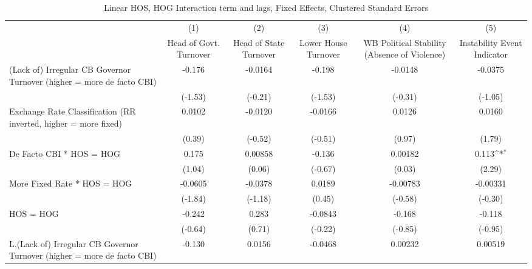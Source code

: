 {
\def\sym#1{\ifmmode^{#1}\else\(^{#1}\)\fi}
\begin{longtable}{l*{5}{c}}
\caption{Linear HOS, HOG Interaction term and lags, Fixed Effects, Clustered Standard Errors \label{hoshogintlagsDF}}\\
\hline\hline\endfirsthead\hline\endhead\hline\endfoot\endlastfoot
                &\multicolumn{1}{c}{(1)}&\multicolumn{1}{c}{(2)}&\multicolumn{1}{c}{(3)}&\multicolumn{1}{c}{(4)}&\multicolumn{1}{c}{(5)}\\
                &\multicolumn{1}{c}{Head of Govt. Turnover}&\multicolumn{1}{c}{Head of State Turnover}&\multicolumn{1}{c}{Lower House Turnover}&\multicolumn{1}{c}{WB Political Stability (Absence of Violence)}&\multicolumn{1}{c}{Instability Event Indicator}\\
\hline
(Lack of) Irregular CB Governor Turnover (higher = more de facto CBI)&   -0.176         &  -0.0164         &   -0.198         &  -0.0148         &  -0.0375         \\
                &  (-1.53)         &  (-0.21)         &  (-1.53)         &  (-0.31)         &  (-1.05)         \\
[1em]
Exchange Rate Classification (RR inverted, higher = more fixed)&   0.0102         &  -0.0120         &  -0.0166         &   0.0126         &   0.0160         \\
                &   (0.39)         &  (-0.52)         &  (-0.51)         &   (0.97)         &   (1.79)         \\
[1em]
De Facto CBI * HOS = HOG&    0.175         &  0.00858         &   -0.136         &  0.00182         &    0.113\sym{*}  \\
                &   (1.04)         &   (0.06)         &  (-0.67)         &   (0.03)         &   (2.29)         \\
[1em]
More Fixed Rate * HOS = HOG&  -0.0605         &  -0.0378         &   0.0189         & -0.00783         & -0.00331         \\
                &  (-1.84)         &  (-1.18)         &   (0.45)         &  (-0.58)         &  (-0.30)         \\
[1em]
HOS = HOG       &   -0.242         &    0.283         &  -0.0843         &   -0.168         &   -0.118         \\
                &  (-0.64)         &   (0.71)         &  (-0.22)         &  (-0.85)         &  (-0.95)         \\
[1em]
L.(Lack of) Irregular CB Governor Turnover (higher = more de facto CBI)&   -0.130         &   0.0156         &  -0.0468         &  0.00232         &  0.00519         \\

\end{longtable}}
